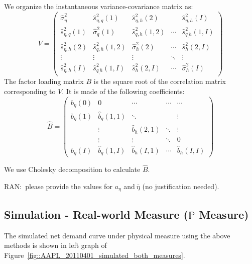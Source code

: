 \documentclass{article}
\begin{document}
We organize the instantaneous variance-covariance matrix as:%
\[
V=\left(
\begin{array}{ccccc}
\hat{\sigma}_{\eta }^{2} & \hat{s}_{\eta ,q}^{2}(1) & \hat{s}_{\eta
,h}^{2}(2) &  & \hat{s}_{\eta ,h}^{2}(I) \\
\hat{s}_{\eta ,q}^{2}(1) & \hat{\sigma}_{q}^{2}(1) & \hat{s}_{q,h}^{2}(1,2)
& \cdots  & \hat{s}_{q_{,}h}^{2}(1,I) \\
\hat{s}_{\eta ,h}^{2}(2) & \hat{s}_{q,h}^{2}(1,2) & \hat{\sigma}_{h}^{2}(2)
& \cdots  & \hat{s}_{h}^{2}(2,I) \\
\vdots  & \vdots  & \vdots  & \ddots  & \vdots  \\
\hat{s}_{\eta ,h}^{2}(I) & \hat{s}_{q_{,}h}^{2}(1,I) & \hat{s}_{h}^{2}(2,I)
& \cdots  & \hat{\sigma}_{h}^{2}(I)%
\end{array}%
\right)
\]%
The factor loading matrix $B$ is the square root of the correlation matrix
corresponding to $V$. It is made of the following coefficients:%
\[
\hat{B}=\left(
\begin{array}{ccccc}
\hat{b}_{\eta }(0) & 0 & \cdots  & \cdots  & \cdots  \\
\hat{b}_{\eta }(1) & \hat{b}_{q}(1,1) & \ddots  &  & \vdots  \\
& \vdots  & \hat{b}_{h}(2,1) & \ddots  & \vdots  \\
& \vdots  & \vdots  & \ddots  & 0 \\
\hat{b}_{\eta }(I) & \hat{b}_{q}(1,I) & \hat{b}_{h}(I,1) & \cdots  & \hat{b}%
_{h}(I,I)%
\end{array}%
\right)
\]

We use Cholesky decomposition to calculate $\hat{B}.$

\bigskip

RAN:\ please provide the values for $a_{\eta }$ and$\ \bar{\eta}$ (no
justification needed).

\subsection{Simulation - Real-world Measure ($\mathbb{P}$ Measure)}

The simulated net demand curve under physical measure using the above
methods is shown in left graph of Figure~\ref{fig::AAPL_20110401_simulated_both_measures}.
\end{document}
